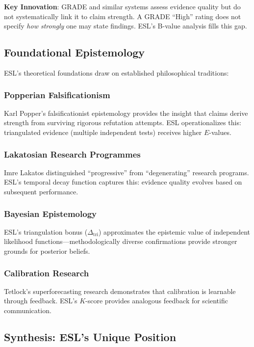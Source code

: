 \documentclass[11pt,a4paper]{article}
\begin{document}
\textbf{Key Innovation}: GRADE and similar systems assess evidence quality but do not systematically link it to claim strength. A GRADE ``High'' rating does not specify \textit{how strongly} one may state findings. ESL's B-value analysis fills this gap.

\subsection{Foundational Epistemology}

ESL's theoretical foundations draw on established philosophical traditions:

\subsubsection{Popperian Falsificationism}
Karl Popper's falsificationist epistemology \citep{Popper1959} provides the insight that claims derive strength from surviving rigorous refutation attempts. ESL operationalizes this: triangulated evidence (multiple independent tests) receives higher $E$-values.

\subsubsection{Lakatosian Research Programmes}
Imre Lakatos \citep{Lakatos1978} distinguished ``progressive'' from ``degenerating'' research programs. ESL's temporal decay function captures this: evidence quality evolves based on subsequent performance.

\subsubsection{Bayesian Epistemology}
ESL's triangulation bonus ($\Delta_{\text{tri}}$) approximates the epistemic value of independent likelihood functions---methodologically diverse confirmations provide stronger grounds for posterior beliefs.

\subsubsection{Calibration Research}
Tetlock's superforecasting research \citep{Tetlock2015} demonstrates that calibration is learnable through feedback. ESL's $K$-score provides analogous feedback for scientific communication.

\subsection{Synthesis: ESL's Unique Position}
\end{document}
